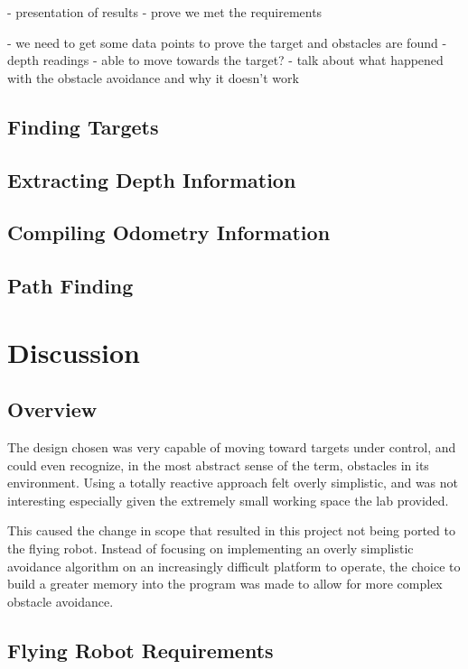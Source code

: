 \documentclass{article}[12]
\begin{document}
	- presentation of results
- prove we met the requirements

- we need to get some data points to prove the target and obstacles are found
- depth readings
- able to move towards the target? 
- talk about what happened with the obstacle avoidance and why it doesn't work


\subsection{Finding Targets}

\subsection{Extracting Depth Information}

\subsection{Compiling Odometry Information}

\subsection{Path Finding}


\section{Discussion}

\subsection{Overview}

	The design chosen was very capable of moving toward targets under control, and could even recognize, in the most abstract sense of the term, obstacles in its environment. Using a totally reactive approach felt overly simplistic, and was not interesting especially given the extremely small working space the lab provided.
	
	This caused the change in scope that resulted in this project not being ported to the flying robot. Instead of focusing on implementing an overly simplistic avoidance algorithm on an increasingly difficult platform to operate, the choice to build a greater memory into the program was made to allow for more complex obstacle avoidance.
	
	
\subsection{Flying Robot Requirements}
\end{document}
